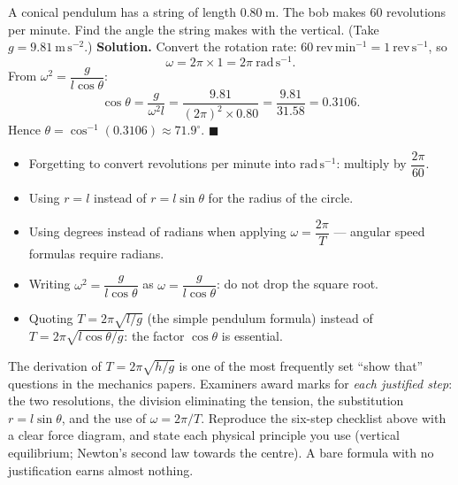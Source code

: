 \documentclass[11pt]{article}
\begin{document}
\begin{exoresolu}
A conical pendulum has a string of length $0.80\ \mathrm{m}$. The bob makes $60$ revolutions per minute. Find the angle the string makes with the vertical. (Take $g = 9.81\ \mathrm{m\,s^{-2}}$.)
\tcblower
\textbf{Solution.} Convert the rotation rate: $60\ \mathrm{rev\,min^{-1}} = 1\ \mathrm{rev\,s^{-1}}$, so
\[
\omega = 2\pi \times 1 = 2\pi\ \mathrm{rad\,s^{-1}}.
\]
From $\omega^{2} = \dfrac{g}{l\cos\theta}$:
\[
\cos\theta = \frac{g}{\omega^{2}l} = \frac{9.81}{(2\pi)^{2}\times 0.80} = \frac{9.81}{31.58} = 0.3106.
\]
Hence $\theta = \cos^{-1}(0.3106) \approx 71.9^{\circ}$. \hfill$\blacksquare$
\end{exoresolu}

\begin{attention}
\begin{itemize}
\item Forgetting to convert revolutions per minute into $\mathrm{rad\,s^{-1}}$: multiply by $\dfrac{2\pi}{60}$.
\item Using $r = l$ instead of $r = l\sin\theta$ for the radius of the circle.
\item Using degrees instead of radians when applying $\omega = \dfrac{2\pi}{T}$ — angular speed formulas require radians.
\item Writing $\omega^{2} = \dfrac{g}{l\cos\theta}$ as $\omega = \dfrac{g}{l\cos\theta}$: do not drop the square root.
\item Quoting $T = 2\pi\sqrt{l/g}$ (the simple pendulum formula) instead of $T = 2\pi\sqrt{l\cos\theta/g}$: the factor $\cos\theta$ is essential.
\end{itemize}
\end{attention}

\begin{savaistu}
The derivation of $T = 2\pi\sqrt{h/g}$ is one of the most frequently set ``show that'' questions in the mechanics papers. Examiners award marks for \emph{each justified step}: the two resolutions, the division eliminating the tension, the substitution $r = l\sin\theta$, and the use of $\omega = 2\pi/T$. Reproduce the six-step checklist above with a clear force diagram, and state each physical principle you use (vertical equilibrium; Newton's second law towards the centre). A bare formula with no justification earns almost nothing.
\end{savaistu}
\end{document}
